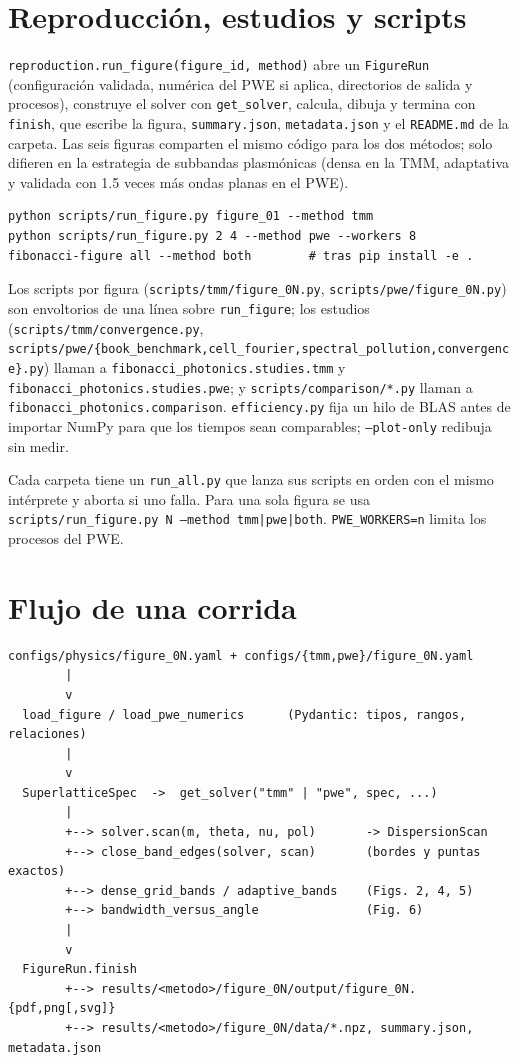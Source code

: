 \documentclass[11pt,a4paper]{article}
\begin{document}
\section{Reproducción, estudios y scripts}

\texttt{reproduction.run\_figure(figure\_id, method)} abre un
\texttt{FigureRun} (configuración validada, numérica del PWE si aplica,
directorios de salida y procesos), construye el solver con
\texttt{get\_solver}, calcula, dibuja y termina con \texttt{finish}, que
escribe la figura, \texttt{summary.json}, \texttt{metadata.json} y el
\texttt{README.md} de la carpeta. Las seis figuras comparten el mismo código
para los dos métodos; solo difieren en la estrategia de subbandas plasmónicas
(densa en la TMM, adaptativa y validada con 1.5 veces más ondas planas en el
PWE).

\begin{lstlisting}
python scripts/run_figure.py figure_01 --method tmm
python scripts/run_figure.py 2 4 --method pwe --workers 8
fibonacci-figure all --method both        # tras pip install -e .
\end{lstlisting}

Los scripts por figura (\texttt{scripts/tmm/figure\_0N.py},
\texttt{scripts/pwe/figure\_0N.py}) son envoltorios de una línea sobre
\texttt{run\_figure}; los estudios (\texttt{scripts/tmm/convergence.py},
\texttt{scripts/pwe/\{book\_benchmark,cell\_fourier,spectral\_pollution,convergence\}.py})
llaman a \texttt{fibonacci\_photonics.studies.tmm} y
\texttt{fibonacci\_photonics.studies.pwe}; y
\texttt{scripts/comparison/*.py} llaman a \texttt{fibonacci\_photonics.comparison}.
\texttt{efficiency.py} fija un hilo de BLAS antes de importar NumPy para que los
tiempos sean comparables; \texttt{--plot-only} redibuja sin medir.

Cada carpeta tiene un \texttt{run\_all.py} que lanza sus scripts en orden con
el mismo intérprete y aborta si uno falla. Para una sola figura se usa
\texttt{scripts/run\_figure.py N --method tmm|pwe|both}.
\texttt{PWE\_WORKERS=n} limita los procesos del PWE.

\section{Flujo de una corrida}

\begin{lstlisting}
configs/physics/figure_0N.yaml + configs/{tmm,pwe}/figure_0N.yaml
        |
        v
  load_figure / load_pwe_numerics      (Pydantic: tipos, rangos, relaciones)
        |
        v
  SuperlatticeSpec  ->  get_solver("tmm" | "pwe", spec, ...)
        |
        +--> solver.scan(m, theta, nu, pol)       -> DispersionScan
        +--> close_band_edges(solver, scan)       (bordes y puntas exactos)
        +--> dense_grid_bands / adaptive_bands    (Figs. 2, 4, 5)
        +--> bandwidth_versus_angle               (Fig. 6)
        |
        v
  FigureRun.finish
        +--> results/<metodo>/figure_0N/output/figure_0N.{pdf,png[,svg]}
        +--> results/<metodo>/figure_0N/data/*.npz, summary.json, metadata.json
\end{lstlisting}
\end{document}
